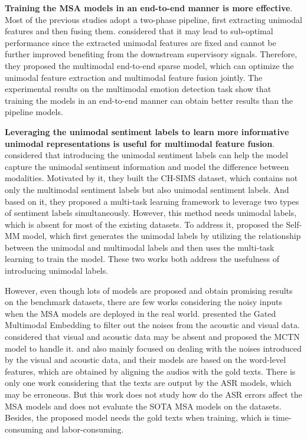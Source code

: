\documentclass[11pt]{article}
\begin{document}
\textbf{Training the MSA models in an end-to-end manner is more effective}. Most of the previous studies adopt a two-phase pipeline, first extracting unimodal features and then fusing them. \citet{dai-etal-2021-multimodal} considered that it may lead to sub-optimal performance since the extracted unimodal features are fixed and cannot be further improved benefiting from the downstream supervisory signals. Therefore, they proposed the multimodal end-to-end sparse model, which can optimize the unimodal feature extraction and multimodal feature fusion jointly. The experimental results on the multimodal emotion detection task show that training the models in an end-to-end manner can obtain better results than the pipeline models.

\textbf{Leveraging the unimodal sentiment labels to learn more informative unimodal representations is useful for multimodal feature fusion}. \citet{yu-etal-2020-ch} considered that introducing the unimodal sentiment labels can help the model capture the unimodal sentiment information and model the difference between modalities. Motivated by it, they built the CH-SIMS dataset, which contains not only the multimodal sentiment labels but also unimodal sentiment labels. And based on it, they proposed a multi-task learning framework to leverage two types of sentiment labels simultaneously. However, this method needs unimodal labels, which is absent for most of the existing datasets. To address it, \citet{Yu_Xu_Yuan_Wu_2021} proposed the Self-MM model, which first generates the unimodal labels by utilizing the relationship between the unimodal and multimodal labels and then uses the multi-task learning to train the model. These two works both address the usefulness of introducing unimodal labels.

However, even though lots of models are proposed and obtain promising results on the benchmark datasets, there are few works considering the noisy inputs when the MSA models are deployed in the real world. \citet{10.1145/3136755.3136801} presented the Gated Multimodal Embedding to filter out the noises from the acoustic and visual data. \citet{Pham_Liang_Manzini_Morency_2019} considered that visual and acoustic data may be absent and proposed the MCTN model to handle it.  \citet{liang-etal-2019-learning} and \citet{Mittal_Bhattacharya_Chandra_Bera_Manocha_2020} also mainly focused on dealing with the noises introduced by the visual and acoustic data, and their models are based on the word-level features, which are obtained by aligning the audios with the gold texts. There is only one work \cite{dumpala2018sentiment} considering that the texts are output by the ASR models, which may be erroneous. But this work does not study how do the ASR errors affect the MSA models and does not evaluate the SOTA MSA models on the datasets. Besides, the proposed model needs the gold texts when training, which is time-consuming and labor-consuming.
\end{document}
